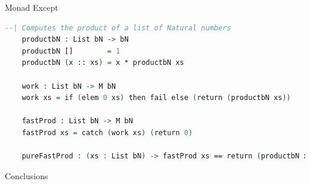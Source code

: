 \documentclass{beamer}
\begin{document}
\begin{frame}[fragile]{Monad Except}
  \begin{lstlisting}[language=Agda, mathescape]
    --| Computes the product of a list of Natural numbers
    productbN : List bN -> bN
    productbN []        = 1
    productbN (x :: xs) = x * productbN xs

    work : List bN -> M bN
    work xs = if (elem 0 xs) then fail else (return (productbN xs))

    fastProd : List bN -> M bN
    fastProd xs = catch (work xs) (return 0)

    pureFastProd : (xs : List bN) -> fastProd xs == return (productbN xs)

  \end{lstlisting}
\end{frame}

\begin{frame}{Conclusions}
\end{frame}
\end{document}
